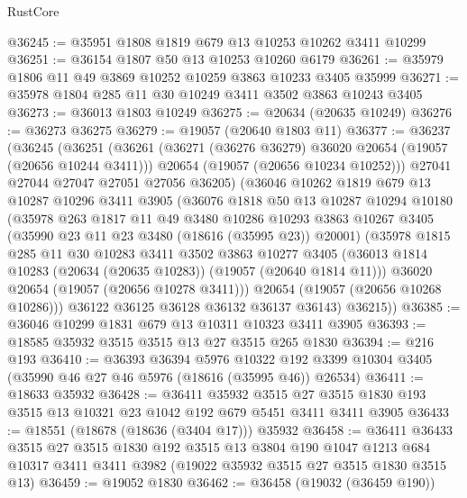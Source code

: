 \begin{lexlean}{RustCore}
\begin{coremodule}
@36245 := @35951 @1808 @1819 @679 @13 @10253 @10262 @3411 @10299
@36251 := @36154 @1807 @50 @13 @10253 @10260 @6179
@36261 := @35979 @1806 @11 @49 @3869 @10252 @10259 @3863 @10233 @3405 @35999
@36271 := @35978 @1804 @285 @11 @30 @10249 @3411 @3502 @3863 @10243 @3405
@36273 := @36013 @1803 @10249
@36275 := @20634 (@20635 @10249)
@36276 := @36273 @36275
@36279 := @19057 (@20640 @1803 @11)
@36377 := @36237
    (@36245
      (@36251
        (@36261
          (@36271 (@36276 @36279) @36020 @20654 (@19057 (@20656 @10244 @3411)))
          @20654
          (@19057 (@20656 @10234 @10252)))
        @27041
        @27044
        @27047
        @27051
        @27056
        @36205)
      (@36046
        @10262
        @1819
        @679
        @13
        @10287
        @10296
        @3411
        @3905
        (@36076
          @1818
          @50
          @13
          @10287
          @10294
          @10180
          (@35978
            @263
            @1817
            @11
            @49
            @3480
            @10286
            @10293
            @3863
            @10267
            @3405
            (@35990 @23 @11 @23 @3480 (@18616 (@35995 @23)) @20001)
            (@35978
              @1815
              @285
              @11
              @30
              @10283
              @3411
              @3502
              @3863
              @10277
              @3405
              (@36013 @1814 @10283 (@20634 (@20635 @10283)) (@19057 (@20640 @1814 @11)))
              @36020
              @20654
              (@19057 (@20656 @10278 @3411)))
            @20654
            (@19057 (@20656 @10268 @10286)))
          @36122
          @36125
          @36128
          @36132
          @36137
          @36143)
        @36215))
@36385 := @36046 @10299 @1831 @679 @13 @10311 @10323 @3411 @3905
@36393 := @18585 @35932 @3515 @3515 @13 @27 @3515 @265 @1830
@36394 := @216 @193
@36410 := @36393
    @36394
    @5976
    @10322
    @192
    @3399
    @10304
    @3405
    (@35990 @46 @27 @46 @5976 (@18616 (@35995 @46)) @26534)
@36411 := @18633 @35932
@36428 := @36411
    @35932
    @3515
    @27
    @3515
    @1830
    @193
    @3515
    @13
    @10321
    @23
    @1042
    @192
    @679
    @5451
    @3411
    @3411
    @3905
@36433 := @18551 (@18678 (@18636 (@3404 @17))) @35932
@36458 := @36411
    @36433
    @3515
    @27
    @3515
    @1830
    @192
    @3515
    @13
    @3804
    @190
    @1047
    @1213
    @684
    @10317
    @3411
    @3411
    @3982
    (@19022 @35932 @3515 @27 @3515 @1830 @3515 @13)
@36459 := @19052 @1830
@36462 := @36458 (@19032 (@36459 @190))

\end{coremodule}
\end{lexlean}
